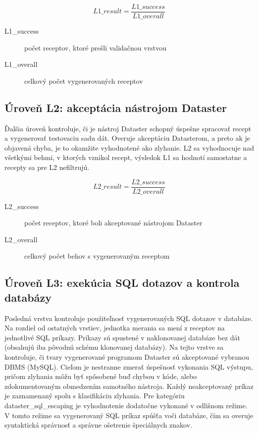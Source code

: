 \begin{equation}
        L1\_result = \frac{L1\_success}{L1\_overall}    
\end{equation}

\begin{description}
    \item[L1\_success] počet receptov, ktoré prešli validačnou vrstvou
    \item[L1\_overall] celkový počet vygenerovaných receptov
\end{description}

\subsection{Úroveň L2: akceptácia nástrojom Dataster}
Ďalšia úroveň kontroluje, či je nástroj Dataster schopný úspešne spracovať recept a vygenerovať testovaciu sadu dát. Overuje akceptáciu Datasterom, a preto ak je objavená chyba, je to okamžite vyhodnotené ako zlyhanie. L2 sa vyhodnocuje nad všetkými behmi, v ktorých vznikol recept, výsledok L1 sa hodnotí samostatne a recepty sa pre L2 nefiltrujú.

\begin{equation}
        L2\_result = \frac{L2\_success}{L2\_overall}
\end{equation}

\begin{description}
    \item[L2\_success] počet receptov, ktoré boli akceptované nástrojom Dataster
    \item[L2\_overall] celkový počet behov s vygenerovaným receptom
\end{description}

\subsection{Úroveň L3: exekúcia SQL dotazov a kontrola databázy}

Posledná vrstva kontroluje použiteľnosť vygenerovaných SQL dotazov v databáze. Na rozdiel od ostatných vrstiev, jednotka merania sa mení z receptov na jednotlivé SQL príkazy. Príkazy sú spustené v naklonovanej databáze bez dát (obsahujú iba pôvodnú schému klonovanej databázy). Na tejto vrstve sa kontroluje, či tvary vygenerované programom Dataster sú akceptované vybranou DBMS (MySQL). Cieľom je nestranne zmerať úspešnosť vykonania SQL výstupu, pričom zlyhania môžu byť spôsobené buď chybou v kóde, alebo zdokumentovaným obmedzením samotného nástroja. Každý neakceptovaný príkaz je zaznamenaný spolu s klasifikáciu zlyhania. Pre kategóriu dataster\_sql\_escaping je vyhodnotenie dodatočne vykonané v odlišnom režime. V tomto režime sa vygenerovaný SQL príkaz spúšťa voči databáze, čím sa overuje syntaktická správnosť a správne ošetrenie špeciálnych znakov.

